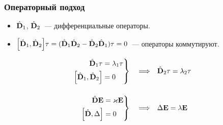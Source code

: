 \documentclass{beamer}
\begin{document}
    \begin{frame}\frametitle{Операторный подход}

        \begin{itemize}

            \item $\hat{\mathbf{D}}_1$, $\hat{\mathbf{D}}_2$~--- дифференциальные операторы.

            \item $\qty[\hat{\mathbf{D}}_1, \hat{\mathbf{D}}_2] \tau = (\hat{\mathbf{D}}_1\hat{\mathbf{D}}_2 - \hat{\mathbf{D}}_2\hat{\mathbf{D}}_1) \tau = 0$~--- операторы коммутируют.

        \end{itemize}

        \begin{align}
            \left. \begin{aligned}
                \hat{\mathbf{D}}_1 \tau &= \lambda_1 \tau \\
                \qty[\hat{\mathbf{D}}_1, \hat{\mathbf{D}}_2] &= 0
            \end{aligned} \right\}
            \quad \Longrightarrow \quad &
            \hat{\mathbf{D}}_2 \tau = \lambda_2 \tau \\[12pt]
            \left. \begin{aligned}
                \hat{\mathbf{D}} \vb{E} &= \varkappa \vb{E} \\
                \qty[\hat{\mathbf{D}}, \Delta] &= 0
            \end{aligned} \right\}
            \quad \Longrightarrow \quad &
            \Delta \vb{E} = \lambda \vb{E}
        \end{align}

    \end{frame}

\end{document}
